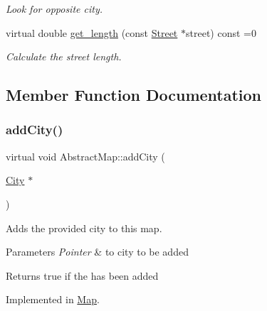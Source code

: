 \begin{DoxyCompactItemize}
\begin{DoxyCompactList}\small\item\em Look for opposite city. \end{DoxyCompactList}\item 
virtual double \hyperlink{class_abstract_map_a19a4ead06c11b297f7ec9731574fa326}{get\+\_\+length} (const \hyperlink{class_street}{Street} $\ast$street) const =0
\begin{DoxyCompactList}\small\item\em Calculate the street length. \end{DoxyCompactList}\end{DoxyCompactItemize}


\subsection{Member Function Documentation}
\mbox{\label{class_abstract_map_a9938512c5ef94370786a3d1a72aa7e37}} 
\subsubsection{\texorpdfstring{add\+City()}{addCity()}}
{\footnotesize\ttfamily virtual void Abstract\+Map\+::add\+City (\begin{DoxyParamCaption}\item[{\hyperlink{class_city}{City} $\ast$}]{ }\end{DoxyParamCaption})\hspace{0.3cm}{\ttfamily [pure virtual]}}



Adds the provided city to this map. 


\begin{DoxyParams}{Parameters}
{\em Pointer} & to city to be added \\
\hline
\end{DoxyParams}
\begin{DoxyReturn}{Returns}
true if the has been added 
\end{DoxyReturn}


Implemented in \hyperlink{class_map_a3313ee9e1dc1bc7e8865ab2c64082ca8}{Map}.

\mbox{\label{class_abstract_map_a179d25c28087d9090314caff024b1f46}} 
